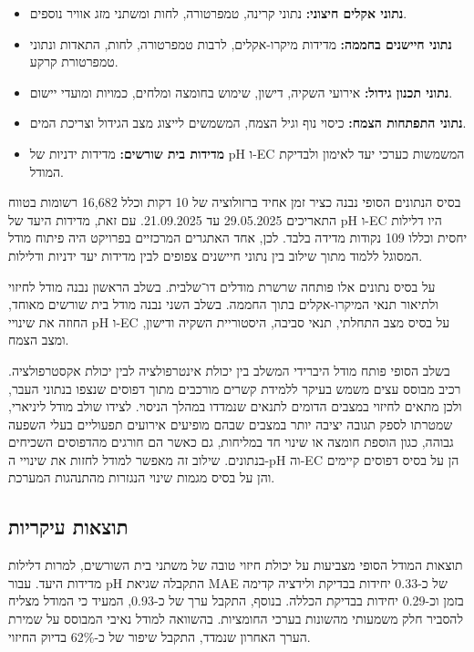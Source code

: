\begin{itemize}
    \item \textbf{נתוני אקלים חיצוני:} נתוני קרינה, טמפרטורה, לחות ומשתני מזג אוויר נוספים.
    \item \textbf{נתוני חיישנים בחממה:} מדידות מיקרו-אקלים, לרבות טמפרטורה, לחות, התאדות ונתוני טמפרטורת קרקע.
    \item \textbf{נתוני תכנון גידול:} אירועי השקיה, דישון, שימוש בחומצה ומלחים, כמויות ומועדי יישום.
    \item \textbf{נתוני התפתחות הצמח:} כיסוי נוף וגיל הצמח, המשמשים לייצוג מצב הגידול וצריכת המים.
    \item \textbf{מדידות בית שורשים:} מדידות ידניות של pH ו-EC המשמשות כערכי יעד לאימון ולבדיקת המודל.
\end{itemize}

בסיס הנתונים הסופי נבנה כציר זמן אחיד ברזולוציה של 10 דקות וכלל 16{,}682 רשומות בטווח התאריכים 29.05.2025 עד 21.09.2025. עם זאת, מדידות היעד של pH ו-EC היו דלילות יחסית וכללו 109 נקודות מדידה בלבד. לכן, אחד האתגרים המרכזיים בפרויקט היה פיתוח מודל המסוגל ללמוד מתוך שילוב בין נתוני חיישנים צפופים לבין מדידות יעד ידניות ודלילות.

על בסיס נתונים אלו פותחה שרשרת מודלים דו־שלבית. בשלב הראשון נבנה מודל לחיזוי ולתיאור תנאי המיקרו-אקלים בתוך החממה. בשלב השני נבנה מודל בית שורשים מאוחד, החוזה את שינויי pH ו-EC על בסיס מצב התחלתי, תנאי סביבה, היסטוריית השקיה ודישון, ומצב הצמח.

בשלב הסופי פותח מודל היברידי המשלב בין יכולת אינטרפולציה לבין יכולת אקסטרפולציה. רכיב מבוסס עצים משמש בעיקר ללמידת קשרים מורכבים מתוך דפוסים שנצפו בנתוני העבר, ולכן מתאים לחיזוי במצבים הדומים לתנאים שנמדדו במהלך הניסוי. לצידו שולב מודל ליניארי, שמטרתו לספק תגובה יציבה יותר במצבים שבהם מופיעים אירועים תפעוליים בעלי השפעה גבוהה, כגון הוספת חומצה או שינוי חד במליחות, גם כאשר הם חורגים מהדפוסים השכיחים בנתונים. שילוב זה מאפשר למודל לחזות את שינויי ה-pH וה-EC הן על בסיס דפוסים קיימים והן על בסיס מגמות שינוי הנגזרות מהתנהגות המערכת.

\subsection{תוצאות עיקריות}
תוצאות המודל הסופי מצביעות על יכולת חיזוי טובה של משתני בית השורשים, למרות דלילות מדידות היעד. עבור pH התקבלה שגיאת MAE של כ-0.33 יחידות בבדיקת ולידציה קדימה בזמן וכ-0.29 יחידות בבדיקת הכללה. בנוסף, התקבל ערך \Rtwo{} של כ-0.93, המעיד כי המודל מצליח להסביר חלק משמעותי מהשונות בערכי החומציות. בהשוואה למודל נאיבי המבוסס על שמירת הערך האחרון שנמדד, התקבל שיפור של כ-62\% בדיוק החיזוי.


